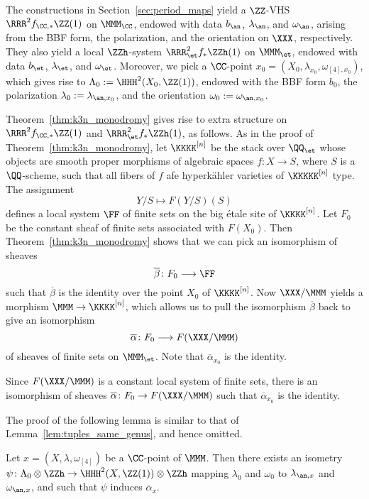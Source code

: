 The constructions in Section~\ref{sec:period_maps} yield a $\ZZ$-VHS $\RRR^2 f_{\CC,*} \ZZ(1)$ on $\MMM_{\CC}$, endowed with data $b_{\an}$, $\lambda_{\an}$, and $\omega_{\an}$, arising from the BBF form, the polarization, and the orientation on $\XXX$, respectively. They also yield a local $\ZZh$-system $\RRR_{\et}^2 f_* \ZZh(1)$ on $\MMM_{\et}$, endowed with data $b_{\et}$, $\lambda_{\et}$, and $\omega_{\et}$. Moreover, we pick a $\CC$-point $x_0 = (X_0,\lambda_{x_0},\omega_{[4],x_0})$, which gives rise to $\Lambda_0 := \HHH^2(X_0,\ZZ(1))$, endowed with the BBF form $b_0$, the polarization $\lambda_0 := \lambda_{\an,x_0}$, and the orientation $\omega_0 := \omega_{\an,x_0}$.

Theorem~\ref{thm:k3n_monodromy} gives rise to extra structure on $\RRR^2 f_{\CC,*}\ZZ(1)$ and $\RRR^2_{\et} f_* \ZZh(1)$, as follows. As in the proof of Theorem~\ref{thm:k3n_monodromy}, let $\KKKK^{[n]}$ be the stack over $\QQ_{\et}$ whose objects are smooth proper morphisms of algebraic spaces $f\colon X \rightarrow S$, where $S$ is a $\QQ$-scheme, such that all fibers of $f$ afe hyperk\"ahler varieties of $\KKKKK^{[n]}$ type. The assignment
$$
Y/S \longmapsto F(Y/S)(S)
$$
defines a local system $\FF$ of finite sets on the big \'etale site of $\KKKK^{[n]}$. Let $F_0$ be the constant sheaf of finite sets associated with $F(X_0)$. Then Theorem~\ref{thm:k3n_monodromy} shows that we can pick an isomorphism of sheaves 
\begin{equation}\label{eq:beta_k3n}
\overline{\beta}\colon F_0 \longrightarrow \FF
\end{equation}
such that $\overline{\beta}$ is the identity over the point $X_0$ of $\KKKK^{[n]}$. Now $\XXX/\MMM$ yields a morphism $\MMM \rightarrow \KKKK^{[n]}$, which allows us to pull the isomorphism $\overline{\beta}$ back to give an isomorphism
$$
\overline{\alpha}\colon F_0 \longrightarrow F(\XXX/\MMM)
$$
of sheaves of finite sets on $\MMM_{\et}$. Note that $\overline{\alpha}_{x_0}$ is the identity.

Since $F(\XXX/\MMM)$ is a constant local system of finite sets, there is an isomorphism of sheaves $\overline{\alpha}\colon F_0 \rightarrow F(\XXX/\MMM)$ such that $\overline{\alpha}_{x_0}$ is the identity.

The proof of the following lemma is similar to that of Lemma~\ref{lem:tuples_same_genus}, and hence omitted.
\begin{lemma}\label{lem:same_genus_k3n}
    Let $x = (X,\lambda,\omega_{[4]})$ be a $\CC$-point of $\MMM$. Then there exists an isometry $\psi\colon \Lambda_0 \otimes \ZZh \rightarrow \HHH^2(X,\ZZ(1)) \otimes \ZZh$ mapping $\lambda_0$ and $\omega_0$ to $\lambda_{\an,x}$ and $\omega_{\an,x}$, and such that $\psi$ induces $\overline{\alpha}_{x}$.
\end{lemma}

